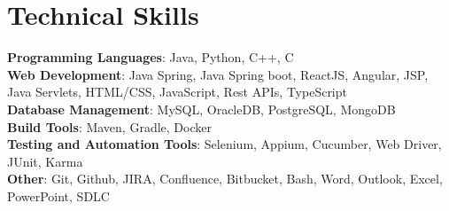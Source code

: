 \documentclass[letterpaper,11pt]{article}
\begin{document}
\section{Technical Skills}
\begin{itemize}[leftmargin=0.15in, label={}]
\small{\item{
\textbf{Programming Languages}{: Java, Python, C++, C} \\
\textbf{Web Development}{: Java Spring, Java Spring boot, ReactJS, Angular, JSP, Java Servlets, HTML/CSS, JavaScript, Rest APIs, TypeScript} \\
\textbf{Database Management}{: MySQL, OracleDB, PostgreSQL, MongoDB} \\
\textbf{Build Tools}{: Maven, Gradle, Docker} \\
\textbf{Testing and Automation Tools}{: Selenium, Appium, Cucumber, Web Driver, JUnit, Karma} \\
\textbf{Other}{: Git, Github, JIRA, Confluence, Bitbucket, Bash, Word, Outlook, Excel, PowerPoint, SDLC} \\

}}
\end{itemize}
\end{document}
